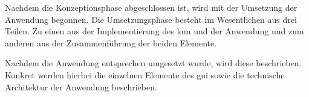 Nachdem die Konzeptionsphase abgeschlossen ist, wird mit der Umsetzung der Anwendung begonnen. Die Umsetzungsphase besteht im Wesentlichen aus drei Teilen. Zu einen aus der Implementierung des \ac{knn} und der Anwendung und zum anderen aus der Zusammenführung der beiden Elemente. 

Nachdem die Anwendung entsprechen umgesetzt wurde, wird diese beschrieben. Konkret werden hierbei die einzelnen Elemente des \ac{gui} sowie die technische Architektur der Anwendung beschrieben.
